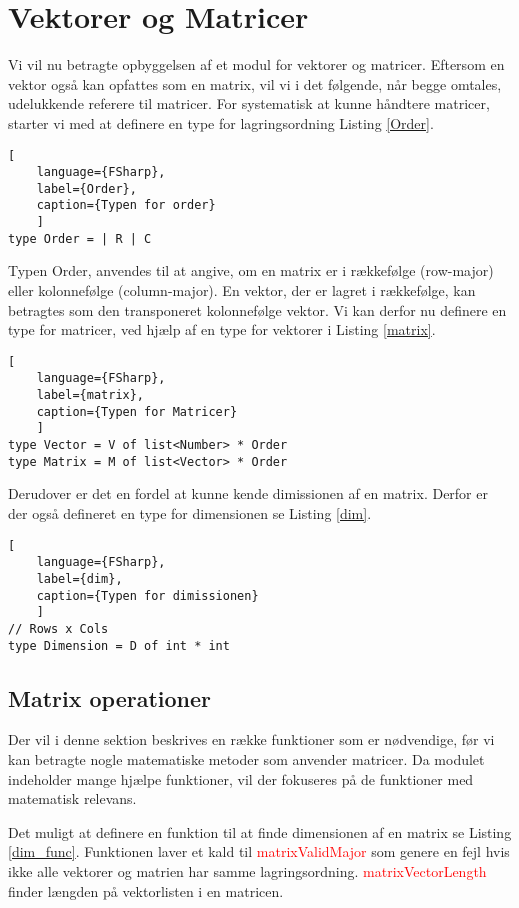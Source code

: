 \section{Vektorer og Matricer}
Vi vil nu betragte opbyggelsen af et modul for vektorer og matricer. Eftersom en vektor også kan opfattes som en matrix, vil vi i det følgende, når begge omtales, udelukkende referere til matricer. For systematisk at kunne håndtere matricer, starter vi med at definere en type for lagringsordning Listing \ref{Order}.

\begin{lstlisting}[
    language={FSharp}, 
    label={Order}, 
    caption={Typen for order}
    ]
type Order = | R | C
\end{lstlisting}

Typen Order, anvendes til at angive, om en matrix er i rækkefølge (row-major) eller kolonnefølge (column-major). En vektor, der er lagret i rækkefølge, kan betragtes som den transponeret kolonnefølge vektor. Vi kan derfor nu definere en type for matricer, ved hjælp af en type for vektorer i Listing \ref{matrix}.

\begin{lstlisting}[
    language={FSharp}, 
    label={matrix}, 
    caption={Typen for Matricer}
    ]
type Vector = V of list<Number> * Order
type Matrix = M of list<Vector> * Order
\end{lstlisting}

Derudover er det en fordel at kunne kende dimissionen af en matrix. Derfor er der også defineret en type for dimensionen se Listing \ref{dim}.

\begin{lstlisting}[
    language={FSharp}, 
    label={dim}, 
    caption={Typen for dimissionen}
    ]
// Rows x Cols
type Dimension = D of int * int
\end{lstlisting}


\subsection{Matrix operationer}
Der vil i denne sektion beskrives en række funktioner som er nødvendige, før vi kan betragte nogle matematiske metoder som anvender matricer. Da modulet indeholder mange hjælpe funktioner, vil der fokuseres på de funktioner med matematisk relevans.

Det muligt at definere en funktion til at finde dimensionen af en matrix se Listing \ref{dim_func}. Funktionen laver et kald til \textcolor{red}{matrixValidMajor} som genere en fejl hvis ikke alle vektorer og matrien har samme lagringsordning. \textcolor{red}{matrixVectorLength} finder længden på vektorlisten i en matricen.

